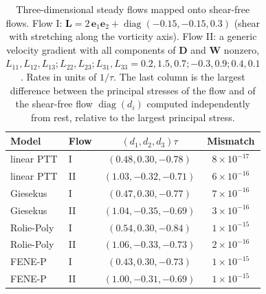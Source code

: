 \begin{table}
\caption{Three-dimensional steady flows mapped onto shear-free flows. Flow I: $\bm L=2\,\bm e_1\bm e_2+\operatorname{diag}(-0.15,-0.15,0.3)$ (shear with stretching along the vorticity axis). Flow II: a generic velocity gradient with all components of $\bm D$ and $\bm W$ nonzero, $L_{11},L_{12},L_{13};L_{22},L_{23};L_{31},L_{33}=0.2,1.5,0.7;-0.3,0.9;0.4,0.1$. Rates in units of $1/\tau$. The last column is the largest difference between the principal stresses of the flow and of the shear-free flow $\operatorname{diag}(d_i)$ computed independently from rest, relative to the largest principal stress.}\label{tab:3d}
\begin{ruledtabular}
\begin{tabular}{llcc}
Model & Flow & $(d_1,d_2,d_3)\tau$ & Mismatch\\
\hline
linear PTT & I & $(0.48,0.30,-0.78)$ & $8\times10^{-17}$ \\
linear PTT & II & $(1.03,-0.32,-0.71)$ & $6\times10^{-16}$ \\
Giesekus & I & $(0.47,0.30,-0.77)$ & $7\times10^{-16}$ \\
Giesekus & II & $(1.04,-0.35,-0.69)$ & $3\times10^{-16}$ \\
Rolie-Poly & I & $(0.54,0.30,-0.84)$ & $1\times10^{-15}$ \\
Rolie-Poly & II & $(1.06,-0.33,-0.73)$ & $2\times10^{-16}$ \\
FENE-P & I & $(0.43,0.30,-0.73)$ & $1\times10^{-15}$ \\
FENE-P & II & $(1.00,-0.31,-0.69)$ & $1\times10^{-15}$ \\
\end{tabular}
\end{ruledtabular}
\end{table}
